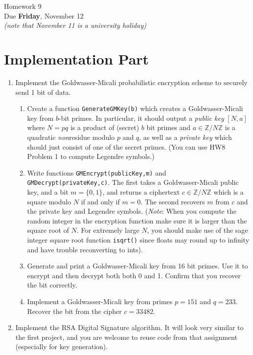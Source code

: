 \documentclass[11pt]{article}
\newcommand{\bZ}{\mathbb{Z}}
\begin{document}
\begin{center}
\Large {Homework 9}\\
\small {Due \textbf{Friday}, November 12}\\
\scriptsize {\textit{(note that November 11 is a university holiday)}}
\end{center}
\section*{Implementation Part}
\begin{enumerate}
  \item{
  Implement the Goldwasser-Micali probabilistic encryption scheme to securely send 1 bit of data.
  \begin{enumerate}
    \item{
    Create a function \verb|GenerateGMKey(b)| which creates a Goldwasser-Micali key from $b$-bit primes.  In particular, it should output a \textit{public key} $[N,a]$ where $N = pq$ is a product of (secret) $b$ bit primes and $a\in\bZ/N\bZ$ is a quadratic \textit{non}residue modulo $p$ and $q$, as well as a \textit{private key} which should just consist of one of the secret primes.  (You can use HW8 Problem 1 to compute Legendre symbols.)
    }
    \item{
    Write functions \verb|GMEncrypt(publicKey,m)| and \verb|GMDecrypt(privateKey,c)|.  The first takes a Goldwasser-Micali public key, and a bit $m = \{0,1\}$, and returns a ciphertext $c\in\bZ/N\bZ$ which is a square modulo $N$ if and only if $m=0$. The second recovers $m$ from $c$ and the private key and Legendre symbols.  (\textit{Note}: When you compute the random integer in the encryption function make sure it is larger than the square root of $N$.  For extremely large $N$, you should make use of the sage integer square root function \verb|isqrt()| since floats may round up to infinity and have trouble reconverting to ints).
    }
    \item{
    Generate and print a Goldwasser-Micali key from 16 bit primes.  Use it to encrypt and then decrypt both both 0 and 1.  Confirm that you recover the bit correctly.
    }
    \item{
    Implement a Goldwasser-Micali key from primes $p=151$ and $q=233$.  Recover the bit from the cipher $c = 33482$.
    }
  \end{enumerate}
  }
  \item{
  Implement the RSA Digital Signature algorithm.  It will look very similar to the first project, and you are welcome to reuse code from that assignment (especially for key generation).
}
\end{enumerate}
\end{document}
